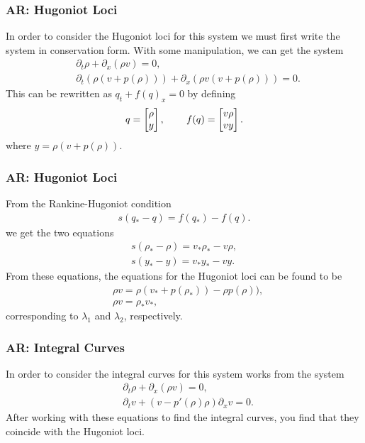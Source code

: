 \documentclass{beamer}
\begin{document}


\begin{frame}
\frametitle{AR: Hugoniot Loci}
In order to consider the Hugoniot loci for this system we must first write the system in conservation form. 
With some manipulation, we can get the system
\begin{align*}
&\partial_t\rho + \partial_x(\rho v) = 0, \\
&\partial_t \left(\rho\left(v + p(\rho )\right)\right) + \partial_x \left( \rho v\left(v + p(\rho )\right)\right) = 0.
\end{align*}
This can be rewritten as $q_t + f(q)_x = 0$ by defining
\begin{align*}
q = \left[ \begin{matrix}
\rho \\ y
\end{matrix}\right], \hspace{0.3in}
f(q) = \left[ \begin{matrix}
v\rho \\
vy
\end{matrix}\right].
\end{align*}
where $y = \rho\left(v + p(\rho )\right)$.
\end{frame}

\begin{frame}
\frametitle{AR: Hugoniot Loci}
From the Rankine-Hugoniot condition
\begin{align*}
s(q_*- q) = f(q_*) - f(q).
\end{align*}
we get the two equations
\begin{align*}
s(\rho_* - \rho) = v_*\rho_* - v\rho,\\
s(y_* - y) = v_*y_* - vy.
\end{align*}
From these equations, the equations for the Hugoniot loci can be found to be
\begin{align*}
&\rho v = \rho \left( v_* + p(\rho_*)\right) - \rho p(\rho)),\\
&\rho v = \rho_* v_*,
\end{align*}
corresponding to $\lambda_1$ and $\lambda_2$, respectively.
\end{frame}

\begin{frame}
\frametitle{AR: Integral Curves}
In order to consider the integral curves for this system \cite{AwRascle2000} 
works from the system
\begin{align*}
&\partial_t \rho + \partial_x (\rho v) = 0, \\ 
&\partial_t v + \left(v - p'(\rho)\rho\right)\partial_x v = 0.
\end{align*}
After working with these equations to find the integral curves, you find that they coincide with the Hugoniot loci.
\end{frame}
\end{document}
